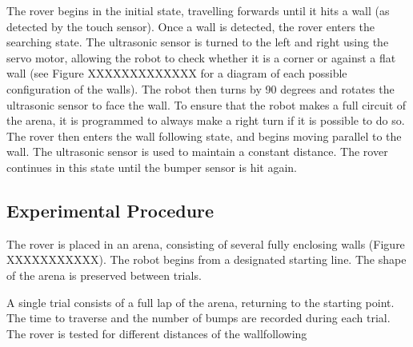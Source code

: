 \documentclass[a4paper,12pt,twocolumn]{article}
\begin{document}
The rover begins in the initial state, travelling forwards until it hits a wall (as detected by the touch sensor). Once a wall is detected, the rover enters the searching state. The ultrasonic sensor is turned to the left and right using the servo motor, allowing the robot to check whether it is a corner or against a flat wall (see Figure XXXXXXXXXXXXX for a diagram of each possible configuration of the walls). The robot then turns by 90 degrees and rotates the ultrasonic sensor to face the wall. 
To ensure that the robot makes a full circuit of the arena, it is programmed to always make a right turn if it is possible to do so.\\

The rover then enters the wall following state, and begins moving parallel to the wall. The ultrasonic sensor is used to maintain a constant distance. The rover continues in this state until the bumper sensor is hit again.

\subsection{Experimental Procedure}

The rover is placed in an arena, consisting of several fully enclosing walls (Figure XXXXXXXXXXX). The robot begins from a designated starting line. The shape of the arena is preserved between trials.

A single trial consists of a full lap of the arena, returning to the starting point. The time to traverse and the number of bumps are recorded during each trial. 
The rover is tested for different distances of the wallfollowing 
\end{document}

